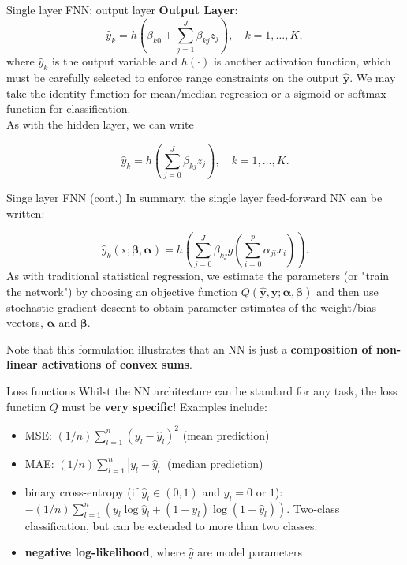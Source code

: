 \documentclass{beamer}
\begin{document}
\begin{frame}{Single layer FNN: output layer}
\textbf{Output Layer}:
$$
\hat{y}_{k}=h\left(\beta_{k 0}+\sum_{j=1}^{J} \beta_{k j} z_{j}\right), \quad k=1, \ldots, K,
$$
where $\hat{y}_{k}$ is the output variable and $h(\cdot)$ is another activation function, which must be carefully selected to enforce range constraints on the output $\hat{\mathbf{y}}$. We may take the identity function for mean/median regression or a sigmoid or softmax function for classification.\\

As with the hidden layer, we can write

$$
\hat{y}_{k}=h\left(\sum_{j=0}^{J} \beta_{k j} z_{j}\right), \quad k=1, \ldots, K.
$$
\end{frame}
\begin{frame}{Singe layer FNN (cont.)}
In summary, the single layer feed-forward NN can be written:

$$
\hat{y}_{k}(\mathrm{x} ; \boldsymbol{\beta}, \boldsymbol{\alpha})=h\left(\sum_{j=0}^{J} \beta_{k j} g\left(\sum_{i=0}^{p} \alpha_{j i} x_{i}\right)\right).
$$
As with traditional statistical regression, we estimate the parameters (or "train the network") by choosing an objective function $Q(\hat{\mathbf{y}},\mathbf{y}; \boldsymbol{\alpha}, \boldsymbol{\beta})$ and then use stochastic gradient descent to obtain parameter estimates of the weight/bias vectors, $\boldsymbol{\alpha}$ and $\boldsymbol{\beta}$.

Note that this formulation illustrates that an NN is just a \textbf{composition of non-linear activations of convex sums}.
\end{frame}
\begin{frame}{Loss functions}
 Whilst the NN architecture can be standard for any task, the loss function $Q$ must be \textbf{very specific}! Examples include:
\begin{itemize}
\item MSE: $(1/n)\sum^n_{l=1}(y_l-\hat{y}_l)^2$ (mean prediction)
\item MAE: $(1/n)\sum^n_{l=1}|y_l-\hat{y}_l|$ (median prediction)
\item binary cross-entropy (if $\hat{y}_l\in(0,1)$ and $y_l=0$ or $1$): $-(1/n)\sum^n_{l=1}(y_l\log\hat{y}_l+(1-y_l)\log(1-\hat{y}_l))$. Two-class classification, but can be extended to more than two classes.
\item \textbf{negative log-likelihood}, where $\hat{y}$ are model parameters
\end{itemize}
\end{frame}
\end{document}

